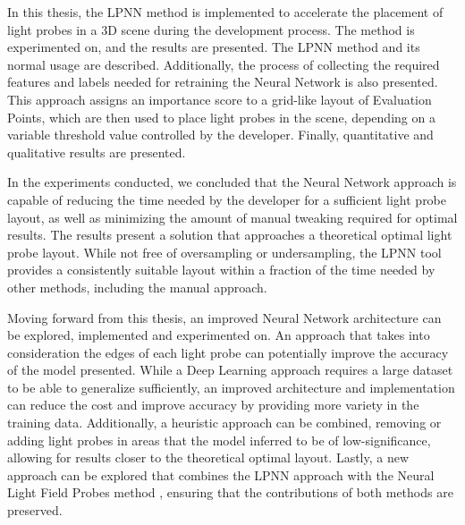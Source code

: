 In this thesis, the LPNN method is implemented to accelerate the placement of light probes in a 3D scene during the development process. The method is experimented on, and the results are presented. The LPNN method and its normal usage are described. Additionally, the process of collecting the required features and labels needed for retraining the Neural Network is also presented. This approach assigns an importance score to a grid-like layout of Evaluation Points, which are then used to place light probes in the scene, depending on a variable threshold value controlled by the developer. Finally, quantitative and qualitative results are presented. 

In the experiments conducted, we concluded that the Neural Network approach is capable of reducing the time needed by the developer for a sufficient light probe layout, as well as minimizing the amount of manual tweaking required for optimal results. The results present a solution that approaches a theoretical optimal light probe layout. While not free of oversampling or undersampling, the LPNN tool provides a consistently suitable layout within a fraction of the time needed by other methods, including the manual approach.

Moving forward from this thesis, an improved Neural Network architecture can be explored, implemented and experimented on. An approach that takes into consideration the edges of each light probe can potentially improve the accuracy of the model presented. While a Deep Learning approach requires a large dataset to be able to generalize sufficiently, an improved architecture and implementation can reduce the cost and improve accuracy by providing more variety in the training data. Additionally, a heuristic approach can be combined, removing or adding light probes in areas that the model inferred to be of low-significance, allowing for results closer to the theoretical optimal layout. Lastly, a new approach can be explored that combines the LPNN approach with the Neural Light Field Probes method \parencite{You2024}, ensuring that the contributions of both methods are preserved.